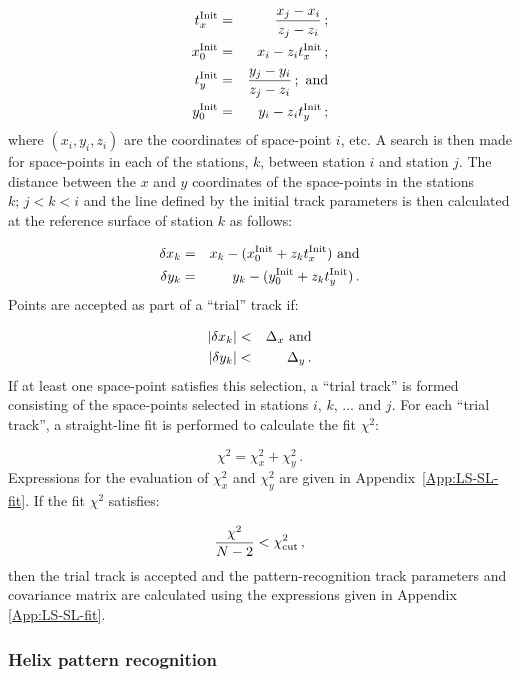\begin{eqnarray}
  t_x^{\rm Init} & = & \frac{x_j - x_i}{z_j - z_i} \,;        \\
  x_0^{\rm Init} & = & x_i - z_i t_x^{\rm Init}      \,;        \\
  t_y^{\rm Init} & = & \frac{y_j - y_i}{z_j - z_i} \,; {\rm~and} \\
  y_0^{\rm Init} & = & y_i - z_i t_y^{\rm Init} \,;
\end{eqnarray}
where $(x_i, y_i, z_i)$ are the coordinates of space-point $i$, etc. A search is then made for space-points in each of the stations, $k$, between station $i$ and station $j$. The distance between the $x$ and $y$ coordinates of the space-points in the stations $k;\,j<k<i$ and the line defined by the initial track parameters is then calculated at the reference surface of station $k$ as follows:

\begin{eqnarray}
  \delta x_k & = & x_k - (x_0^{\rm Init} + z_k t_x^{\rm Init}) {\rm~and} \\
  \delta y_k & = & y_k - (y_0^{\rm Init} + z_k t_y^{\rm Init}) \,.
\end{eqnarray}
Points are accepted as part of a ``trial'' track if:

\begin{eqnarray}
  | \delta x_k | & < & \Delta_x {\rm~and} \\
  | \delta y_k | & < & \Delta_y \,.
\end{eqnarray}
If at least one space-point satisfies this selection, a ``trial track'' is formed consisting of the space-points selected in stations $i$, $k$, ... and $j$. For each ``trial track'', a straight-line fit is performed to calculate the fit $\chi^2$:

\begin{equation}
  \chi^2 = \chi_x^2 + \chi_y^2 \,.
\end{equation}
Expressions for the evaluation of $\chi^2_x$ and $\chi^2_y$ are given in Appendix~\ref{App:LS-SL-fit}. If the fit $\chi^2$ satisfies:

\begin{equation}
  \frac{\chi^2}{N-2} < \chi^2_{\rm cut} \,,
\end{equation}
then the trial track is accepted and the pattern-recognition track parameters and covariance matrix are calculated using the expressions given in Appendix \ref{App:LS-SL-fit}.

\subsubsection{Helix pattern recognition}
\label{SubSect:SciFiSLPatRec}

